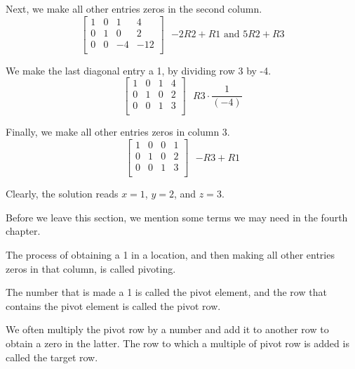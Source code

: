 \begin{solution}
    Next, we make all other entries zeros in the second column.
    \[
        \left[ \begin{array}{ccc|c}
                1 & 0 & 1  & 4   \\
                0 & 1 & 0  & 2   \\
                0 & 0 & -4 & -12 \\
            \end{array} \right] \text{ $-2R2 + R1$ and $5R2 + R3$}
    \]

    We make the last diagonal entry a 1, by dividing row 3 by -4.
    \[
        \left[ \begin{array}{ccc|c}
                1 & 0 & 1 & 4 \\
                0 & 1 & 0 & 2 \\
                0 & 0 & 1 & 3 \\
            \end{array} \right] \text{ $R3 \cdot \frac{1}{(-4)}$}
    \]

    Finally, we make all other entries zeros in column 3.
    \[
        \left[ \begin{array}{ccc|c}
                1 & 0 & 0 & 1 \\
                0 & 1 & 0 & 2 \\
                0 & 0 & 1 & 3 \\
            \end{array} \right] \text{ $-R3 + R1$}
    \]

    Clearly, the solution reads $x = 1$, $y = 2$, and $z = 3$.
\end{solution}

Before we leave this section, we mention some terms we may need in the fourth chapter.

The process of obtaining a 1 in a location, and then making all other entries zeros in that column, is called pivoting.

The number that is made a 1 is called the pivot element, and the row that contains the pivot element is called the pivot row.

We often multiply the pivot row by a number and add it to another row to obtain a zero in the latter.  The row to which a multiple of pivot row is added is called the target row.
